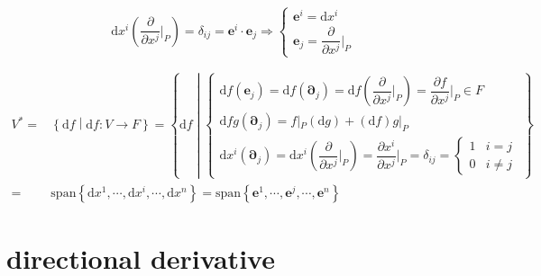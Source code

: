 \documentclass[
]{book}
\theoremstyle{definition}
\theoremstyle{definition}
\theoremstyle{definition}
\theoremstyle{definition}
\theoremstyle{remark}
\begin{document}
\[
\mathrm{d}x^{{\scriptscriptstyle i}}\left(\dfrac{\partial}{\partial x^{{\scriptscriptstyle j}}}|_{{\scriptscriptstyle P}}\right)=\delta_{{\scriptscriptstyle ij}}=\boldsymbol{e}^{{\scriptscriptstyle i}}\cdot\boldsymbol{e}_{{\scriptscriptstyle j}}\Rightarrow\begin{cases}
\boldsymbol{e}^{{\scriptscriptstyle i}}=\mathrm{d}x^{{\scriptscriptstyle i}}\\
\boldsymbol{e}_{{\scriptscriptstyle j}}=\dfrac{\partial}{\partial x^{{\scriptscriptstyle j}}}|_{{\scriptscriptstyle P}}
\end{cases}
\]

\[
\begin{aligned}
V^{*}= & \left\{ \mathrm{d}f\middle|\mathrm{d}f:V\rightarrow F\right\} =\left\{ \mathrm{d}f\middle|\begin{cases}
\mathrm{d}f\left(\boldsymbol{e}_{{\scriptscriptstyle j}}\right)=\mathrm{d}f\left(\boldsymbol{\partial}_{{\scriptscriptstyle j}}\right)=\mathrm{d}f\left(\dfrac{\partial}{\partial x^{{\scriptscriptstyle j}}}|_{{\scriptscriptstyle P}}\right)=\dfrac{\partial f}{\partial x^{{\scriptscriptstyle j}}}|_{{\scriptscriptstyle P}}\in F\\
\mathrm{d}fg\left(\boldsymbol{\partial}_{{\scriptscriptstyle j}}\right)=f|_{{\scriptscriptstyle P}}\left(\mathrm{d}g\right)+\left(\mathrm{d}f\right)g|_{{\scriptscriptstyle P}}\\
\mathrm{d}x^{{\scriptscriptstyle i}}\left(\boldsymbol{\partial}_{{\scriptscriptstyle j}}\right)=\mathrm{d}x^{{\scriptscriptstyle i}}\left(\dfrac{\partial}{\partial x^{{\scriptscriptstyle j}}}|_{{\scriptscriptstyle P}}\right)=\dfrac{\partial x^{{\scriptscriptstyle i}}}{\partial x^{{\scriptscriptstyle j}}}|_{{\scriptscriptstyle P}}=\delta_{{\scriptscriptstyle ij}}=\begin{cases}
1 & i=j\\
0 & i\ne j
\end{cases}
\end{cases}\right\} \\
= & \mathrm{span}\left\{ \mathrm{d}x^{{\scriptscriptstyle 1}},\cdots,\mathrm{d}x^{{\scriptscriptstyle i}},\cdots,\mathrm{d}x^{{\scriptscriptstyle n}}\right\} =\mathrm{span}\left\{ \boldsymbol{e}^{{\scriptscriptstyle 1}},\cdots,\boldsymbol{e}^{{\scriptscriptstyle j}},\cdots,\boldsymbol{e}^{{\scriptscriptstyle n}}\right\} 
\end{aligned}
\]

\section{directional derivative}\label{directional-derivative}
\end{document}

